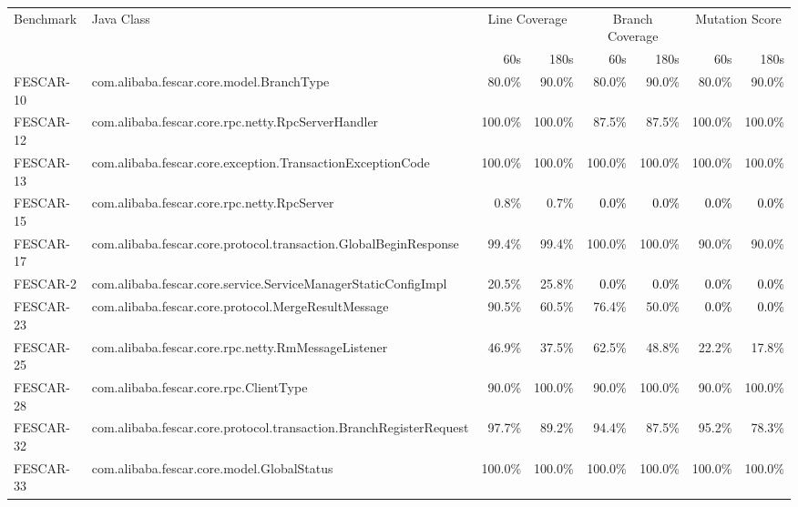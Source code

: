 \begin{tabular}{ ll rr rr rr}\toprule 
 \multirow{2}{1in}{Benchmark} & \multirow{2}{1in}{Java Class} &  \multicolumn{2}{c}{Line Coverage} &  \multicolumn{2}{c}{Branch Coverage} &  \multicolumn{2}{c}{Mutation Score}\\\cmidrule(lr){3-4}\cmidrule(lr){5-6} \cmidrule(lr){7-8}
 & & 60s & 180s & 60s & 180s & 60s & 180s \\ 
\midrule 
FESCAR-10  &  com.alibaba.fescar.core.model.BranchType & 80.0\% & 90.0\% & 80.0\% & 90.0\% & 80.0\% & 90.0\%\\ 
FESCAR-12  &  com.alibaba.fescar.core.rpc.netty.RpcServerHandler & 100.0\% & 100.0\% & 87.5\% & 87.5\% & 100.0\% & 100.0\%\\ 
FESCAR-13  &  com.alibaba.fescar.core.exception.TransactionExceptionCode & 100.0\% & 100.0\% & 100.0\% & 100.0\% & 100.0\% & 100.0\%\\ 
FESCAR-15  &  com.alibaba.fescar.core.rpc.netty.RpcServer & 0.8\% & 0.7\% & \cellcolor{light-gray} \textcolor{black}{0.0\%} & \cellcolor{light-gray} \textcolor{black}{0.0\%} & \cellcolor{light-gray} \textcolor{black}{0.0\%} & \cellcolor{light-gray} \textcolor{black}{0.0\%}\\ 
FESCAR-17  &  com.alibaba.fescar.core.protocol.transaction.GlobalBeginResponse & 99.4\% & 99.4\% & 100.0\% & 100.0\% & 90.0\% & 90.0\%\\ 
FESCAR-2  &  com.alibaba.fescar.core.service.ServiceManagerStaticConfigImpl & 20.5\% & 25.8\% & \cellcolor{light-gray} \textcolor{black}{0.0\%} & \cellcolor{light-gray} \textcolor{black}{0.0\%} & \cellcolor{light-gray} \textcolor{black}{0.0\%} & \cellcolor{light-gray} \textcolor{black}{0.0\%}\\ 
FESCAR-23  &  com.alibaba.fescar.core.protocol.MergeResultMessage & 90.5\% & 60.5\% & 76.4\% & 50.0\% & \cellcolor{light-gray} \textcolor{black}{0.0\%} & \cellcolor{light-gray} \textcolor{black}{0.0\%}\\ 
FESCAR-25  &  com.alibaba.fescar.core.rpc.netty.RmMessageListener & 46.9\% & 37.5\% & 62.5\% & 48.8\% & 22.2\% & 17.8\%\\ 
FESCAR-28  &  com.alibaba.fescar.core.rpc.ClientType & 90.0\% & 100.0\% & 90.0\% & 100.0\% & 90.0\% & 100.0\%\\ 
FESCAR-32  &  com.alibaba.fescar.core.protocol.transaction.BranchRegisterRequest & 97.7\% & 89.2\% & 94.4\% & 87.5\% & 95.2\% & 78.3\%\\ 
FESCAR-33  &  com.alibaba.fescar.core.model.GlobalStatus & 100.0\% & 100.0\% & 100.0\% & 100.0\% & 100.0\% & 100.0\%\\ 

\end{tabular}
